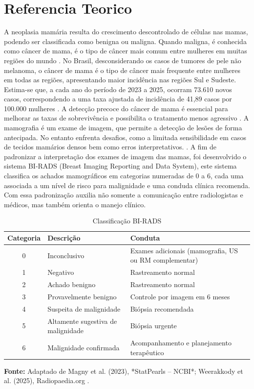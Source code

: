 \documentclass[10pt,conference]{IEEEtran}
\begin{document}
\section{Referencia Teorico}
A neoplasia mamária resulta do crescimento descontrolado de células nas mamas, podendo ser classificada como benigna ou maligna. Quando maligna, é conhecida como câncer de mama, é o tipo de câncer mais comum entre mulheres em muitas regiões do mundo \cite{inca2025}. No Brasil, desconsiderando os casos de tumores de pele não melanoma, o câncer de mama é o tipo de câncer mais frequente entre mulheres em todas as regiões, apresentando maior incidência nas regiões Sul e Sudeste. Estima-se que, a cada ano do período de 2023 a 2025, ocorram 73.610 novos casos, correspondendo a uma taxa ajustada de incidência de 41,89 casos por 100.000 mulheres \cite{inca2025}. A detecção precoce do câncer de mama é essencial para melhorar as taxas de sobrevivência e possibilita o tratamento menos agressivo \cite{paulinelli2004diagnostico}. A mamografia é um exame de imagem, que permite a detecção de lesões de forma antecipada. No entanto enfrenta desafios, como a limitada sensibilidade em casos de tecidos mamários densos bem como erros interpretativos. \cite{guerreiro2024ia}. A fim de padronizar a interpretação dos exames de imagem das mamas, foi desenvolvido o sistema BI-RADS (Breast Imaging Reporting and Data System), este sistema classifica os achados mamográficos em categorias numeradas de 0 a 6, cada uma associada a um nível de risco para malignidade e uma conduda clínica recomenda. Com essa padronização auxilia não somente a comunicação entre radiologistas e médicos, mas também orienta o manejo clínico.

\begin{table}[!h]
\renewcommand{\arraystretch}{1.3}
\caption{Classificação BI-RADS}
\label{table:birads}
\centering
\begin{tabular}{|c|l|p{2.5cm}|}
\hline
\textbf{Categoria} & \textbf{Descrição} & \textbf{Conduta} \\
\hline
0 & Inconclusivo & Exames adicionais (mamografia, US ou RM complementar) \\
\hline
1 & Negativo & Rastreamento normal \\
\hline
2 & Achado benigno & Rastreamento normal \\
\hline
3 & Provavelmente benigno & Controle por imagem em 6 meses \\
\hline
4 & Suspeita de malignidade & Biópsia recomendada \\
\hline
5 & Altamente sugestiva de malignidade & Biópsia urgente \\
\hline
6 & Malignidade confirmada & Acompanhamento e planejamento terapêutico \\
\hline
\end{tabular}

\vspace{0.2cm}
\small \textbf{Fonte:} Adaptado de Magny et al. (2023), *StatPearls – NCBI*; Weerakkody et al. (2025), Radiopaedia.org \cite{weerakkody2025birads}.
\end{table}
\end{document}
